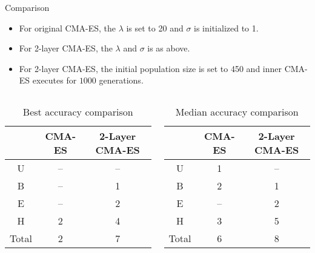 \begin{frame}{Comparison}
  \begin{itemize}
    \item For original CMA-ES, the $\lambda$ is set to 20 and $\sigma$
      is initialized to 1.
    \item For 2-layer CMA-ES, the $\lambda$ and $\sigma$ is as above.
    \item For 2-layer CMA-ES, the initial population size is set to 450
      and inner CMA-ES executes for $1000$ generations.
  \end{itemize}
  \begin{columns}
    \footnotesize
    \begin{column}{0.4\textwidth}
      \begin{table}[h]
        \begin{tabular}{|c|c|c|}
          \hline
          & CMA-ES & 2-Layer CMA-ES \\ \hline
          U & --     & --             \\ \hline
          B & --     & 1              \\ \hline
          E & --     & 2              \\ \hline
          H & 2      & 4              \\ \hline
          Total & 2 & 7 \\\hline
        \end{tabular}
        \caption{Best accuracy comparison}
      \end{table}
    \end{column}
    \begin{column}{0.4\textwidth}
      \begin{table}[h]
        \begin{tabular}{|c|c|c|}
          \hline
          & CMA-ES & 2-Layer CMA-ES \\ \hline
          U     & 1      & --             \\ \hline
          B     & 2      & 1              \\ \hline
          E     & --     & 2              \\ \hline
          H     & 3      & 5              \\ \hline
          Total & 6      & 8              \\ \hline
        \end{tabular}
        \caption{Median accuracy comparison}
      \end{table}
    \end{column}

  \end{columns}
\end{frame}

